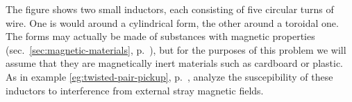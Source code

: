 The figure shows two small inductors, each consisting of
five circular turns of wire. One is would around a cylindrical form,
the other around a toroidal one. The forms may actually be made of
substances with magnetic properties (sec.~\ref{sec:magnetic-materials}, p.~\pageref{sec:magnetic-materials}), but
for the purposes of this problem we will assume that they are magnetically inert
materials such as cardboard or plastic. As in example
\ref{eg:twisted-pair-pickup}, p.~\pageref{eg:twisted-pair-pickup},
analyze the suscepibility of these inductors to interference from
external stray magnetic fields.
